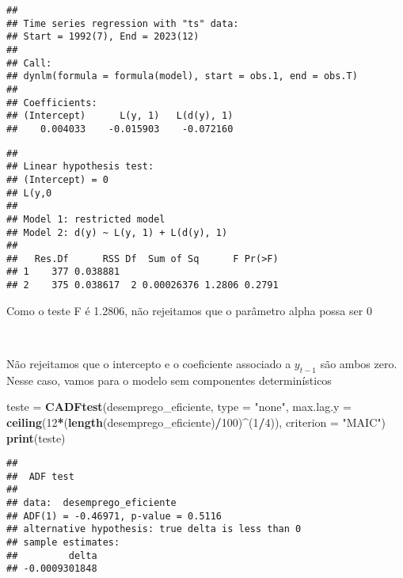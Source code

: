 \documentclass[
]{article}
\newenvironment{Shaded}{\begin{snugshade}}{\end{snugshade}}
\newcommand{\AttributeTok}[1]{\textcolor[rgb]{0.13,0.29,0.53}{#1}}
\newcommand{\DecValTok}[1]{\textcolor[rgb]{0.00,0.00,0.81}{#1}}
\newcommand{\FunctionTok}[1]{\textcolor[rgb]{0.13,0.29,0.53}{\textbf{#1}}}
\newcommand{\NormalTok}[1]{#1}
\newcommand{\OtherTok}[1]{\textcolor[rgb]{0.56,0.35,0.01}{#1}}
\newcommand{\SpecialCharTok}[1]{\textcolor[rgb]{0.81,0.36,0.00}{\textbf{#1}}}
\newcommand{\StringTok}[1]{\textcolor[rgb]{0.31,0.60,0.02}{#1}}
\begin{document}
\begin{verbatim}
## 
## Time series regression with "ts" data:
## Start = 1992(7), End = 2023(12)
## 
## Call:
## dynlm(formula = formula(model), start = obs.1, end = obs.T)
## 
## Coefficients:
## (Intercept)      L(y, 1)   L(d(y), 1)  
##    0.004033    -0.015903    -0.072160
\end{verbatim}

\begin{Shaded}
\end{Shaded}

\begin{verbatim}
## 
## Linear hypothesis test:
## (Intercept) = 0
## L(y,0
## 
## Model 1: restricted model
## Model 2: d(y) ~ L(y, 1) + L(d(y), 1)
## 
##   Res.Df      RSS Df  Sum of Sq      F Pr(>F)
## 1    377 0.038881                            
## 2    375 0.038617  2 0.00026376 1.2806 0.2791
\end{verbatim}

Como o teste F é 1.2806, não rejeitamos que o parâmetro alpha possa ser
0

~

Não rejeitamos que o intercepto e o coeficiente associado a \(y_{t-1}\)
são ambos zero. Nesse caso, vamos para o modelo sem componentes
determinísticos

\begin{Shaded}
\begin{Highlighting}[]
\NormalTok{teste }\OtherTok{=} \FunctionTok{CADFtest}\NormalTok{(desemprego\_eficiente, }\AttributeTok{type =} \StringTok{"none"}\NormalTok{, }\AttributeTok{max.lag.y =} \FunctionTok{ceiling}\NormalTok{(}\DecValTok{12}\SpecialCharTok{*}\NormalTok{(}\FunctionTok{length}\NormalTok{(desemprego\_eficiente)}\SpecialCharTok{/}\DecValTok{100}\NormalTok{)}\SpecialCharTok{\^{}}\NormalTok{(}\DecValTok{1}\SpecialCharTok{/}\DecValTok{4}\NormalTok{)), }
                 \AttributeTok{criterion =} \StringTok{"MAIC"}\NormalTok{)}
\FunctionTok{print}\NormalTok{(teste)}
\end{Highlighting}
\end{Shaded}

\begin{verbatim}
## 
##  ADF test
## 
## data:  desemprego_eficiente
## ADF(1) = -0.46971, p-value = 0.5116
## alternative hypothesis: true delta is less than 0
## sample estimates:
##         delta 
## -0.0009301848
\end{verbatim}
\end{document}
